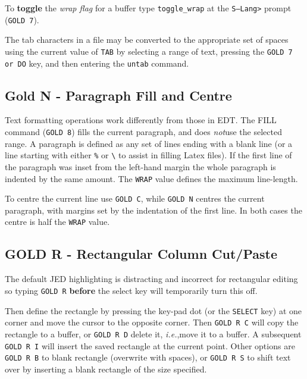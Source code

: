 \documentclass[twoside,11pt]{article}
\newcommand{\xlabel}[1]{}
\begin{document}
To \textbf{toggle} the \textit{wrap flag} for a buffer type
\texttt{toggle\_wrap} at the \texttt{S--Lang>} prompt (\texttt{GOLD 7}).

The tab characters in a file may be converted to the appropriate set of
spaces using the current value of \texttt{TAB} by selecting a range of text,
pressing the \texttt{GOLD 7 or DO} key, and then entering the 
\texttt{untab} command.

\subsection{Gold N - Paragraph Fill and Centre\xlabel{paragraph_fill_and_centre}}
\label{gold-n}

Text formatting operations work differently from those in EDT\@. The
FILL command (\texttt{GOLD 8}) fills the current paragraph, and does
\textit{not}\/use the selected range.  A paragraph is defined as any set
of lines ending with a blank line (or a line starting with either
\texttt{\%} or \verb+\+ to assist in filling Latex files). If the first
line of the paragraph was inset from the left-hand margin the whole
paragraph is indented by the same amount.  The \texttt{WRAP} value
defines the maximum line-length.

To centre the current line use \texttt{GOLD C}, while \texttt{GOLD N} centres
the current paragraph, with margins set by the indentation of the first
line.  In both cases the centre is half the \texttt{WRAP} value.

\subsection{GOLD R - Rectangular Column Cut/Paste
\xlabel{rectangular_column_cutpaste}}
\label{gold-r}

The default JED highlighting is distracting and incorrect for rectangular 
editing so typing \texttt{GOLD R} \textbf{before} the select key will
temporarily turn this off.

Then define the rectangle by pressing the key-pad dot (or the
\texttt{SELECT} key) at one corner and move the cursor to the opposite
corner.  Then \texttt{GOLD R C} will copy the rectangle to a buffer, or
\texttt{GOLD R D} delete it, \emph{i.e.},\/move it to a buffer.  A
subsequent \texttt{GOLD R I} will insert the saved rectangle at the
current point.  Other options are \texttt{GOLD R B} to blank rectangle
(overwrite with spaces), or \texttt{GOLD R S} to shift text over by
inserting a blank rectangle of the size specified.
\end{document}
